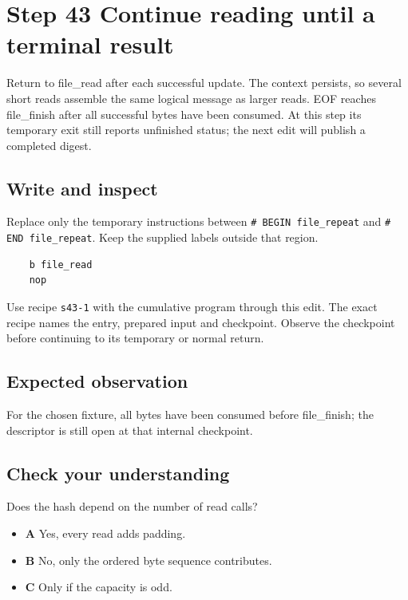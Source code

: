 \section{Step 43 Continue reading until a terminal result}\label{sha-s43}

Return to file\_read after each successful update. The context persists, so several short reads assemble the same logical message as larger reads. EOF reaches file\_finish after all successful bytes have been consumed. At this step its temporary exit still reports unfinished status; the next edit will publish a completed digest.

\subsection{Write and inspect}
Replace only the temporary instructions between \texttt{\# BEGIN file\_repeat} and \texttt{\# END file\_repeat}. Keep the supplied labels outside that region.

\begin{verbatim}
    b file_read
    nop
\end{verbatim}

Use recipe \texttt{s43-1} with the cumulative program through this edit. The exact recipe names the entry, prepared input and checkpoint. Observe the checkpoint before continuing to its temporary or normal return.

\subsection{Expected observation}
For the chosen fixture, all bytes have been consumed before file\_finish; the descriptor is still open at that internal checkpoint.

\subsection{Check your understanding}
Does the hash depend on the number of read calls?

\begin{itemize}
  \item \textbf{A} Yes, every read adds padding.
  \item \textbf{B} No, only the ordered byte sequence contributes.
  \item \textbf{C} Only if the capacity is odd.
\end{itemize}
